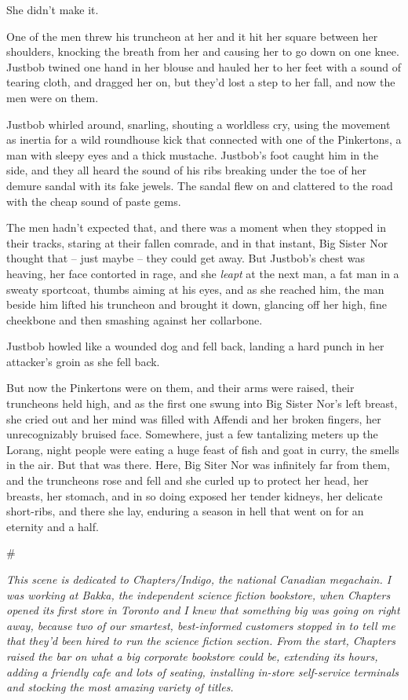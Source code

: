 She didn't make it.

One of the men threw his truncheon at her and it hit her square
between her shoulders, knocking the breath from her and causing her
to go down on one knee. Justbob twined one hand in her blouse and
hauled her to her feet with a sound of tearing cloth, and dragged
her on, but they'd lost a step to her fall, and now the men were on
them.

Justbob whirled around, snarling, shouting a worldless cry, using
the movement as inertia for a wild roundhouse kick that connected
with one of the Pinkertons, a man with sleepy eyes and a thick
mustache. Justbob's foot caught him in the side, and they all heard
the sound of his ribs breaking under the toe of her demure sandal
with its fake jewels. The sandal flew on and clattered to the road
with the cheap sound of paste gems.

The men hadn't expected that, and there was a moment when they
stopped in their tracks, staring at their fallen comrade, and in
that instant, Big Sister Nor thought that -- just maybe -- they
could get away. But Justbob's chest was heaving, her face contorted
in rage, and she \emph{leapt} at the next man, a fat man in a
sweaty sportcoat, thumbs aiming at his eyes, and as she reached
him, the man beside him lifted his truncheon and brought it down,
glancing off her high, fine cheekbone and then smashing against her
collarbone.

Justbob howled like a wounded dog and fell back, landing a hard
punch in her attacker's groin as she fell back.

But now the Pinkertons were on them, and their arms were raised,
their truncheons held high, and as the first one swung into Big
Sister Nor's left breast, she cried out and her mind was filled
with Affendi and her broken fingers, her unrecognizably bruised
face. Somewhere, just a few tantalizing meters up the Lorang, night
people were eating a huge feast of fish and goat in curry, the
smells in the air. But that was there. Here, Big Siter Nor was
infinitely far from them, and the truncheons rose and fell and she
curled up to protect her head, her breasts, her stomach, and in so
doing exposed her tender kidneys, her delicate short-ribs, and
there she lay, enduring a season in hell that went on for an
eternity and a half.

\#

\emph{This scene is dedicated to Chapters/Indigo, the national Canadian megachain. I was working at Bakka, the independent science fiction bookstore, when Chapters opened its first store in Toronto and I knew that something big was going on right away, because two of our smartest, best-informed customers stopped in to tell me that they'd been hired to run the science fiction section. From the start, Chapters raised the bar on what a big corporate bookstore could be, extending its hours, adding a friendly cafe and lots of seating, installing in-store self-service terminals and stocking the most amazing variety of titles.}

